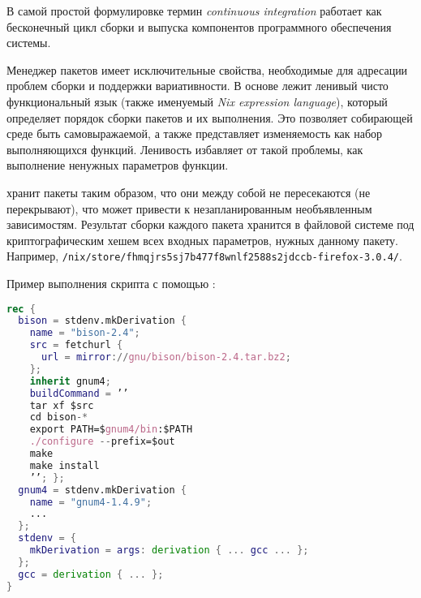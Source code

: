 В самой простой формулировке термин \emph{continuous integration} работает
как бесконечный цикл сборки и выпуска компонентов программного обеспечения системы.

Менеджер пакетов \nix \cite{hydra_manager} имеет исключительные свойства, необходимые для адресации проблем сборки и поддержки вариативности. В основе \nix лежит ленивый чисто функциональный язык (также именуемый \emph{Nix expression language}), который определяет порядок сборки пакетов и их выполнения. Это позволяет собирающей среде быть самовыражаемой, а также представляет изменяемость как набор выполняющихся функций. Ленивость избавляет от такой проблемы, как выполнение ненужных параметров функции.

\nix хранит пакеты таким образом, что они между собой не пересекаются (не перекрывают), что может привести к незапланированным необъявленным зависимостям. Результат сборки каждого пакета хранится в файловой системе под криптографическим хешем всех входных параметров, нужных данному пакету. Например, \linebreak\lstinline{/nix/store/fhmqjrs5sj7b477f8wnlf2588s2jdccb-firefox-3.0.4/}.

Пример выполнения скрипта с помощью \nix:

\begin{lstlisting}[language=Nix]
rec {
  bison = stdenv.mkDerivation {
    name = "bison-2.4";
    src = fetchurl {
      url = mirror://gnu/bison/bison-2.4.tar.bz2;
    };
    inherit gnum4;
    buildCommand = ’’
    tar xf $src
    cd bison-*
    export PATH=$gnum4/bin:$PATH
    ./configure --prefix=$out
    make
    make install
    ’’; };
  gnum4 = stdenv.mkDerivation {
    name = "gnum4-1.4.9";
    ...
  };
  stdenv = {
    mkDerivation = args: derivation { ... gcc ... };
  };
  gcc = derivation { ... };
}
\end{lstlisting}
